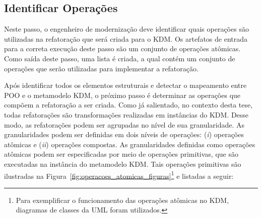 \subsection{Identificar Operações}\label{sec:refatoracao_para_o_metamodelo_kdm}

Neste passo, o engenheiro de modernização deve identificar quais operações são utilizadas na refatoração que será criada para o KDM. Os artefatos de entrada para a correta execução deste passo são um conjunto de operações atômicas. Como saída deste passo, uma lista é criada, a qual contém um conjunto de operações que serão utilizadas para implementar a refatoração.

Após identificar todos os elementos estruturais e detectar o mapeamento entre POO e o metamodelo KDM, o próximo passo é determinar as operações que compõem a refatoração a ser criada. Como já salientado, no contexto desta tese, todas refatorações são transformações realizadas em instâncias do KDM. Desse modo, as refatorações podem ser agrupadas no nível de sua granularidade. As granularidades podem ser definidas em dois níveis de operações: (\textit{i}) operações atômicas e (\textit{ii}) operações compostas. As granularidades definidas como operações atômicas podem ser especificadas por meio de operações primitivas, que são executadas na instância do metamodelo KDM. Tais operações primitivas são ilustradas na Figura~\ref{fig:operacoes_atomicas_figuras}\footnote{Para exemplificar o funcionamento das operações atômicas no KDM, diagramas de classes da UML foram utilizados.} e listadas a seguir:





